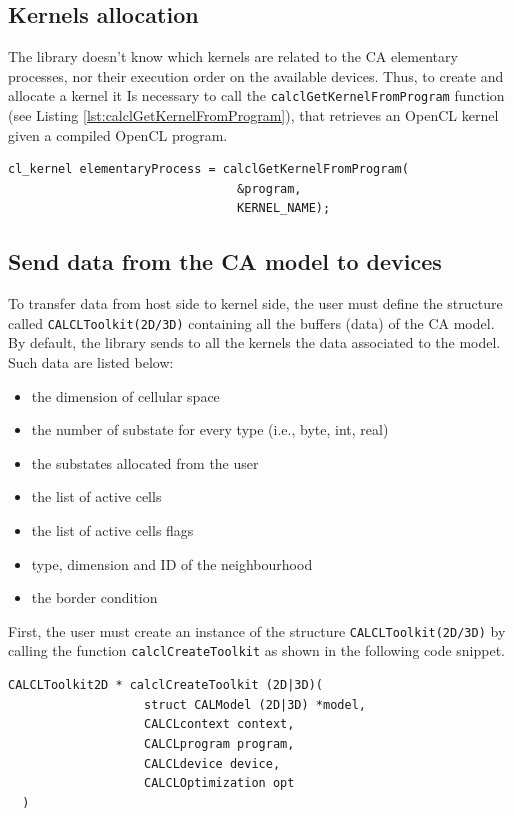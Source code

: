 \subsection{Kernels allocation}

The library doesn't know which kernels are related to the CA
elementary processes, nor their execution order on the available
devices. Thus, to create and allocate a kernel it Is necessary to call
the \verb'calclGetKernelFromProgram' function (see Listing
\ref{lst:calclGetKernelFromProgram}), that retrieves an OpenCL kernel
given a compiled OpenCL program.

\begin{lstlisting}[float,floatplacement=H, label=lst:calclGetKernelFromProgram, caption=The calclGetKernelFromProgram function., numbers=none]
  cl_kernel elementaryProcess = calclGetKernelFromProgram(
                                &program,
                                KERNEL_NAME);
\end{lstlisting}

\subsection{Send data from the CA model to devices}

To transfer data from host side to kernel side, the user must define
the structure called \verb'CALCLToolkit(2D/3D)' containing all the
buffers (data) of the CA model.  By default, the library sends to all
the kernels the data associated to the model. Such data are listed
below:

\begin{itemize}
	\item the dimension of cellular space
	\item the number of substate for every type (i.e., byte, int, real)
	\item the substates allocated from the user
	\item the list of active cells
	\item the list of active cells flags
	\item type, dimension and ID of the neighbourhood
	\item the border condition
\end{itemize}

First, the user must create an instance of the structure
\verb'CALCLToolkit(2D/3D)' by calling the function
\verb'calclCreateToolkit' as shown in the following code snippet.

\begin{lstlisting}[numbers=none]
  CALCLToolkit2D * calclCreateToolkit (2D|3D)(
                   struct CALModel (2D|3D) *model,
                   CALCLcontext context,
                   CALCLprogram program,
                   CALCLdevice device,
                   CALCLOptimization opt
  )
\end{lstlisting}

